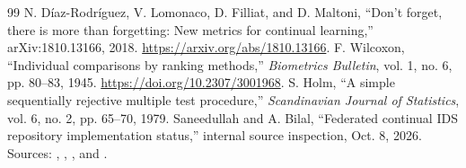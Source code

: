 \documentclass[10pt,a4paper]{article}
\begin{document}
\begin{thebibliography}{99}
 N. D\'iaz-Rodr\'iguez, V. Lomonaco, D. Filliat, and D. Maltoni, ``Don't forget, there is more than forgetting: New metrics for continual learning,'' arXiv:1810.13166, 2018. \url{https://arxiv.org/abs/1810.13166}.
 F. Wilcoxon, ``Individual comparisons by ranking methods,'' \emph{Biometrics Bulletin}, vol. 1, no. 6, pp. 80--83, 1945. \url{https://doi.org/10.2307/3001968}.
 S. Holm, ``A simple sequentially rejective multiple test procedure,'' \emph{Scandinavian Journal of Statistics}, vol. 6, no. 2, pp. 65--70, 1979.
 Saneedullah and A. Bilal, ``Federated continual IDS repository implementation status,'' internal source inspection, Oct. 8, 2026. Sources: , , , and .
\end{thebibliography}
\end{document}
